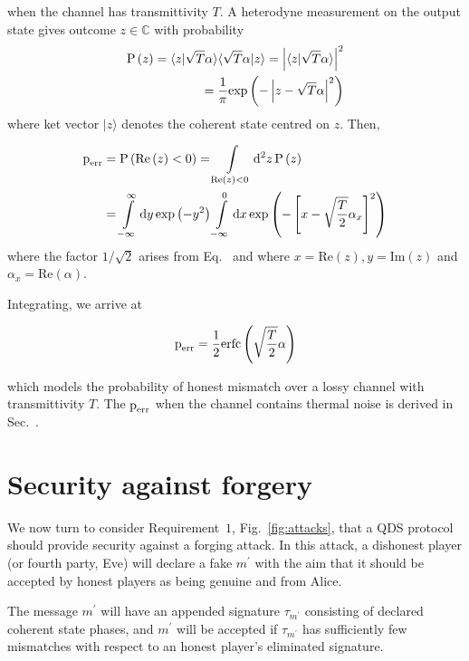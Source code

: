 \noindent when the channel has transmittivity $T$.  A heterodyne measurement on the output state gives outcome $z \in \mathbb{C}$ with probability
\begin{align}
\text{P}\left(z\right) = \langle z | \sqrt{T}\alpha\rangle\langle\sqrt{T}\alpha|z\rangle = \left|\langle z | \sqrt{T} \alpha \rangle \right|^2& \notag \\
= \frac{1}{\pi}\text{exp}\left( - \left| z - \sqrt{T}\alpha \right|^2 \right)&
\end{align}
where ket vector $|z\rangle$ denotes the coherent state centred on $z$. Then,

\begin{align}
\text{p}_{\text{err}} &= \text{P}\left(\text{Re}\left(z\right)<0\right) = \int\limits_{\text{Re}\left(z\right)<0}\mathop{}\!\mathrm{d^2} z \, \text{P}\left(z\right) \notag \\
&= \int\limits_{-\infty}^{\infty} \mathrm{d} y \, \text{exp}\left(-y^2\right) \int\limits_{-\infty}^{0} \mathrm{d} x \, \text{exp}\left(-\left[x - \sqrt{\frac{T}{2}}\alpha_x\right]^2\right)
\end{align}
where the factor $1/\sqrt{2}$ arises from Eq.~ %
and where $x = \text{Re}\left(z\right), y = \text{Im}\left(z\right)$ and $\alpha_x = \text{Re}\left(\alpha\right)$. 

Integrating, we arrive at

\begin{equation}\label{eqn:perr}
\text{p}_{\text{err}} = \frac{1}{2}\text{erfc}\left(\sqrt{\frac{T}{2}}\alpha\right)
\end{equation}

\noindent which models the probability of honest mismatch over a lossy channel with transmittivity $T$. The $\text{p}_{\text{err}}$ when the channel contains thermal noise is derived in Sec.~.

\section{Security against forgery}
We now turn to consider Requirement~$1$, Fig.~\ref{fig:attacks}, that a QDS protocol should provide security against a forging attack. In this attack, a dishonest player (or fourth party, Eve) will declare a fake $m^\prime$ with the aim that it should be accepted by honest players as being genuine and from Alice. 

The message $m^\prime$ will have an appended signature $\tau_{m^\prime}$ consisting of declared coherent state phases, and $m^\prime$ will be accepted if $\tau_{m^\prime}$ has sufficiently few mismatches with respect to an honest player's eliminated signature. 

